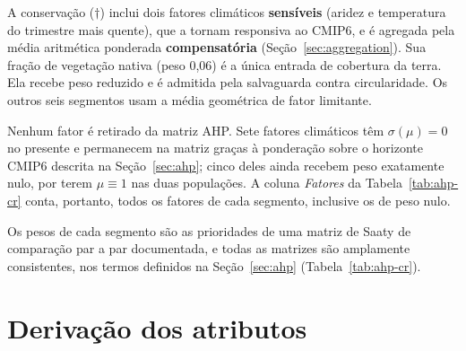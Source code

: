 A conservação ($\dagger$) inclui dois fatores climáticos \textbf{sensíveis} (aridez e
temperatura do trimestre mais quente), que a tornam responsiva ao CMIP6, e é agregada pela
média aritmética ponderada \textbf{compensatória} (Seção~\ref{sec:aggregation}). Sua fração de
vegetação nativa (peso 0,06) é a única entrada de cobertura da terra. Ela recebe peso reduzido e é
admitida pela salvaguarda contra circularidade. Os outros seis segmentos usam a média geométrica de
fator limitante.

Nenhum fator é retirado da matriz AHP. Sete fatores climáticos têm $\sigma(\mu) = 0$ no presente e
permanecem na matriz graças à ponderação sobre o horizonte CMIP6 descrita na Seção~\ref{sec:ahp};
cinco deles ainda recebem peso exatamente nulo, por terem $\mu \equiv 1$ nas duas populações. A coluna
\emph{Fatores} da Tabela~\ref{tab:ahp-cr} conta, portanto, todos os fatores de cada segmento,
inclusive os de peso nulo.

Os pesos de cada segmento são as prioridades de uma matriz de Saaty de comparação par a par
documentada, e todas as matrizes são amplamente consistentes, nos termos definidos na
Seção~\ref{sec:ahp} (Tabela~\ref{tab:ahp-cr}).

\begin{table}[htbp]
\centering
\caption{Razão de consistência AHP por segmento.}
\label{tab:ahp-cr}

\end{table}

\chapter{Derivação dos atributos}\label{anx:derivations}


